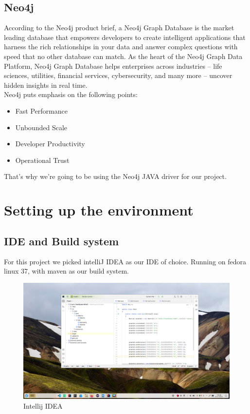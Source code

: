 \documentclass[]{report}
\begin{document}
	\section{Neo4j}
	According to the Neo4j product brief, a Neo4j Graph Database is the market leading database that 
	empowers developers to create intelligent applications that 
	harness the rich relationships in your data and answer complex 
	questions with speed that no other database can match. 
	As the heart of the Neo4j Graph Data Platform, Neo4j Graph 
	Database helps enterprises across industries – life sciences, 
	utilities, financial services, cybersecurity, and many more – 
	uncover hidden insights in real time.\\
	Neo4j puts emphasis on the following points:
	\begin{itemize}
		\item  Fast Performance
		\item Unbounded Scale
		\item Developer Productivity
		\item Operational Trust
	\end{itemize} 
	That's why we're going to be using the Neo4j JAVA driver for our project.
	\newpage
	\chapter{Setting up the environment}
	\newpage
	\section{IDE and Build system}
	For this project we picked intelliJ IDEA as our IDE of choice. Running on fedora linux 37, with maven as our build system.
		\begin{figure}[!htb]
		\centering
		\includegraphics[width=1\textwidth]{intellij.png}
		\caption{Intellij IDEA}
	\end{figure}
	\newpage
\end{document}
